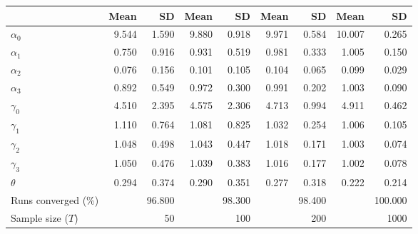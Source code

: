 
\begin{tabular}[t]{lrrrrrrrr}
\toprule
  & Mean & SD & Mean  & SD  & Mean   & SD   & Mean    & SD   \\
\midrule
$\alpha_{0}$ & 9.544 & 1.590 & 9.880 & 0.918 & 9.971 & 0.584 & 10.007 & 0.265\\
$\alpha_{1}$ & 0.750 & 0.916 & 0.931 & 0.519 & 0.981 & 0.333 & 1.005 & 0.150\\
$\alpha_{2}$ & 0.076 & 0.156 & 0.101 & 0.105 & 0.104 & 0.065 & 0.099 & 0.029\\
$\alpha_{3}$ & 0.892 & 0.549 & 0.972 & 0.300 & 0.991 & 0.202 & 1.003 & 0.090\\
$\gamma_{0}$ & 4.510 & 2.395 & 4.575 & 2.306 & 4.713 & 0.994 & 4.911 & 0.462\\
$\gamma_{1}$ & 1.110 & 0.764 & 1.081 & 0.825 & 1.032 & 0.254 & 1.006 & 0.105\\
$\gamma_{2}$ & 1.048 & 0.498 & 1.043 & 0.447 & 1.018 & 0.171 & 1.003 & 0.074\\
$\gamma_{3}$ & 1.050 & 0.476 & 1.039 & 0.383 & 1.016 & 0.177 & 1.002 & 0.078\\
$\theta$ & 0.294 & 0.374 & 0.290 & 0.351 & 0.277 & 0.318 & 0.222 & 0.214\\
Runs converged (\%) &  & 96.800 &  & 98.300 &  & 98.400 &  & 100.000\\
Sample size ($T$) &  & 50 &  & 100 &  & 200 &  & 1000\\
\bottomrule
\end{tabular}
